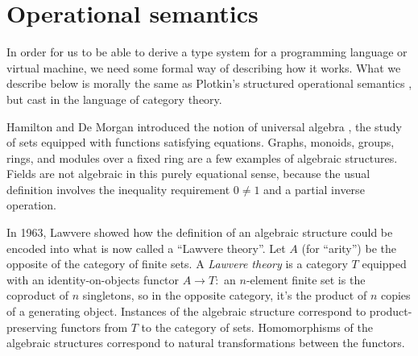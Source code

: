\documentclass[11pt]{article}
\begin{document}
\section{Operational semantics}

In order for us to be able to derive a type system for a programming language or virtual machine, we need some formal way of describing how it works.  What we describe below is morally the same as Plotkin's structured operational semantics \cite{PlotkinSOS}, but cast in the language of category theory.  

Hamilton and De Morgan introduced the notion of universal algebra \cite[preface]{Whitehead1898}, the study of sets equipped with functions satisfying equations. Graphs, monoids, groups, rings, and modules over a fixed ring are a few examples of algebraic structures.  Fields are not algebraic in this purely equational sense, because the usual definition involves the inequality requirement $0 \ne 1$ and a partial inverse operation.

In 1963, Lawvere \cite{Lawvere1963thesis} showed how the definition of an algebraic structure could be encoded into what is now called a ``Lawvere theory''.  Let $A$ (for ``arity'') be the opposite of the category of finite sets.  A {\em Lawvere theory} is a category $T$ equipped with an identity-on-objects functor $A \to T:$  an $n$-element finite set is the coproduct of $n$ singletons, so in the opposite category, it's the product of $n$ copies of a generating object.  Instances of the algebraic structure correspond to product-preserving functors from $T$ to the category of sets.  Homomorphisms of the algebraic structures correspond to natural transformations between the functors.  
\end{document}
